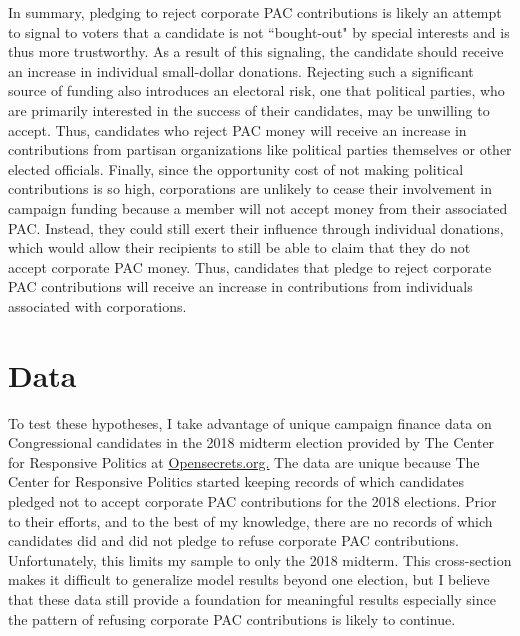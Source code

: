 \documentclass[12pt]{article}
\begin{document}
 In summary, pledging to reject corporate PAC contributions is likely an attempt to signal to voters that a candidate is not ``bought-out" by special interests and is thus more trustworthy. As a result of this signaling, the candidate should receive an increase in individual small-dollar donations. Rejecting such a significant source of funding also introduces an electoral risk, one that political parties, who are primarily interested in the success of their candidates, may be unwilling to accept. Thus, candidates who reject PAC money will receive an increase in contributions from partisan organizations like political parties themselves or other elected officials. Finally, since the opportunity cost of not making political contributions is so high, corporations are unlikely to cease their involvement in campaign funding because a member will not accept money from their associated PAC. Instead, they could still exert their influence through individual donations, which would allow their recipients to still be able to claim that they do not accept corporate PAC money. Thus, candidates that pledge to reject corporate PAC contributions will receive an increase in contributions from individuals associated with corporations.


\section{Data}

To test these hypotheses, I take advantage of unique campaign finance data on Congressional candidates in the 2018 midterm election provided by The Center for Responsive Politics at \href{https://www.opensecrets.org}{Opensecrets.org.} The data are unique because The Center for Responsive Politics started keeping records of which candidates pledged not to accept corporate PAC contributions for the 2018 elections. Prior to their efforts, and to the best of my knowledge, there are no records of which candidates did and did not pledge to refuse corporate PAC contributions. Unfortunately, this limits my sample to only the 2018 midterm. This cross-section makes it difficult to generalize model results beyond one election, but I believe that these data still provide a foundation for meaningful results especially since the pattern of refusing corporate PAC contributions is likely to continue.    
\end{document}
